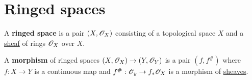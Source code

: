 \documentclass[../../../main]{subfiles}
\begin{document}
\section{Ringed spaces} \label{sec:ringed-spaces}

\begin{definition} \label{def:ringed-space}
  A \textbf{ringed space} is a pair \((X, \mathscr{O}_{X})\) consisting of a topological space \(X\) and a \hyperref[def:sheaf]{sheaf} of rings \(\mathscr{O}_{X}\) over \(X\).

  A \textbf{morphism} of ringed spaces \((X, \mathscr{O}_{X}) \to (Y, \mathscr{O}_{Y})\) is a pair \((f, f^{\#})\) where \(f: X \to Y\) is a continuous map and \(f^{\#}: \mathscr{O}_{y} \to f_{\ast}\mathscr{O}_{X}\) is a morphism of \hyperref[def:sheaf]{sheaves}.
\end{definition}
\end{document}
